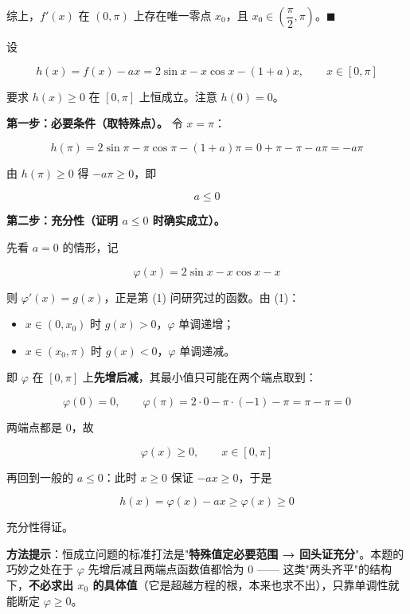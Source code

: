 综上，$f'(x)$ 在 $(0,\pi)$ 上存在唯一零点 $x_0$，且 $x_0\in\left(\dfrac\pi2,\pi\right)$。$\blacksquare$


设

\[h(x)=f(x)-ax=2\sin x-x\cos x-(1+a)x,\qquad x\in[0,\pi]\]

要求 $h(x)\ge0$ 在 $[0,\pi]$ 上恒成立。注意 $h(0)=0$。

\textbf{第一步：必要条件（取特殊点）。} 令 $x=\pi$：

\[h(\pi)=2\sin\pi-\pi\cos\pi-(1+a)\pi=0+\pi-\pi-a\pi=-a\pi\]

由 $h(\pi)\ge0$ 得 $-a\pi\ge0$，即

\[a\le0\]

\textbf{第二步：充分性（证明 $a\le0$ 时确实成立）。}

先看 $a=0$ 的情形，记

\[\varphi(x)=2\sin x-x\cos x-x\]

则 $\varphi'(x)=g(x)$，正是第 (1) 问研究过的函数。由 (1)：

\begin{itemize}
\item $x\in\left(0,x_0\right)$ 时 $g(x)>0$，$\varphi$ 单调递增；
\item $x\in\left(x_0,\pi\right)$ 时 $g(x)<0$，$\varphi$ 单调递减。
\end{itemize}

即 $\varphi$ 在 $[0,\pi]$ 上\textbf{先增后减}，其最小值只可能在两个端点取到：

\[\varphi(0)=0,\qquad \varphi(\pi)=2\cdot0-\pi\cdot(-1)-\pi=\pi-\pi=0\]

两端点都是 $0$，故

\[\varphi(x)\ge0,\qquad x\in[0,\pi]\]

再回到一般的 $a\le0$：此时 $x\ge0$ 保证 $-ax\ge0$，于是

\[h(x)=\varphi(x)-ax\ge\varphi(x)\ge0\]

充分性得证。

\gkanswer{答案：$a\le0$，即 $a\in(-\infty,0]$}

\begin{gktip}
\textbf{方法提示}：恒成立问题的标准打法是"\textbf{特殊值定必要范围 → 回头证充分}"。本题的巧妙之处在于 $\varphi$ 先增后减且两端点函数值都恰为 $0$ —— 这类"两头齐平"的结构下，\textbf{不必求出 $x_0$ 的具体值}（它是超越方程的根，本来也求不出），只靠单调性就能断定 $\varphi\ge0$。
\end{gktip}

\par\medskip

